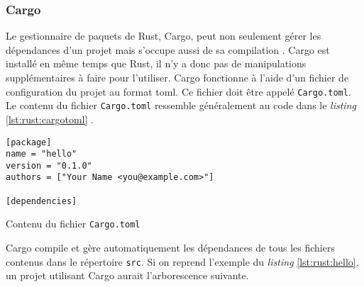
\subsubsection{Cargo}
Le gestionnaire de paquets de Rust, Cargo, peut non seulement gérer les dépendances
d'un projet mais s'occupe aussi de sa compilation \cite{ref3}. Cargo est installé
en même temps que Rust, il n'y a donc pas de manipulations supplémentaires à faire
pour l'utiliser. Cargo fonctionne à l'aide d'un fichier de configuration du projet
au format \acrshort{toml}. Ce fichier doit être appelé \texttt{Cargo.toml}.
Le contenu du fichier \texttt{Cargo.toml} ressemble généralement
au code dans le \textit{listing} \ref{lst:rust:cargotoml} \cite{ref2}.

\begin{code}
\begin{verbatim}
[package]
name = "hello"
version = "0.1.0"
authors = ["Your Name <you@example.com>"]

[dependencies]
\end{verbatim}
\caption{Contenu du fichier \texttt{Cargo.toml}}
\label{lst:rust:cargotoml}
\end{code} \bigbreak

Cargo compile et gère automatiquement les dépendances de tous les fichiers contenus
dans le répertoire \texttt{src}. Si on reprend l'exemple du \textit{listing}
\ref{lst:rust:hello}, un projet utilisant Cargo aurait l'arborescence suivante. \\

 \bigbreak

